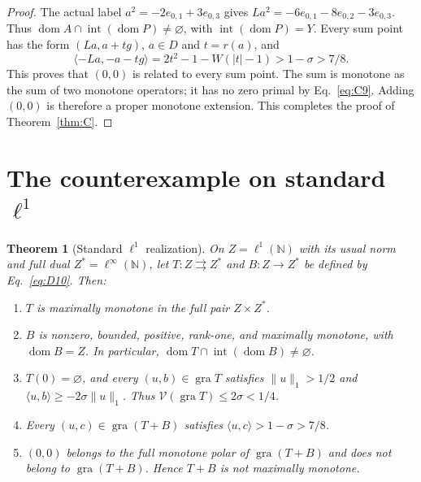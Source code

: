 \documentclass[11pt]{article}
\newcommand{\N}{\mathbb N}
\newcommand{\gra}{\operatorname{gra}}
\newcommand{\dom}{\operatorname{dom}}
\newcommand{\pair}[2]{\langle #1,#2\rangle}
\newtheorem{theorem}{Theorem}
\begin{document}
\begin{proof}
The actual label $a^2=-2e_{0,1}+3e_{0,3}$ gives
$La^2=-6e_{0,1}-8e_{0,2}-3e_{0,3}$. Thus
$\dom A\cap\operatorname{int}(\dom P)\ne\varnothing$, with
$\operatorname{int}(\dom P)=Y$. Every sum point has the form
$(La,a+tg)$, $a\in D$ and $t=r(a)$, and
\begin{equation}
\pair{-La}{-a-tg}=2t^2-1-W(|t|-1)>1-\sigma>7/8.
\tag{C11}\label{eq:C11}
\end{equation}
This proves that $(0,0)$ is related to every sum point. The sum is
monotone as the sum of two monotone operators; it has no zero primal by
Eq.~\eqref{eq:C9}. Adding $(0,0)$ is therefore a proper monotone extension.
This completes the proof of Theorem~\ref{thm:C}.
\end{proof}

\ifdefined\expandedversion
\section{The counterexample on standard $\ell^1$}
\label{sec:l1}
\renewcommand{\thetheorem}{L}
\begin{theorem}[Standard $\ell^1$ realization]\label{thm:L}
On $Z=\ell^1(\N)$ with its usual norm and full dual $Z^*=\ell^\infty(\N)$,
let $T:Z\rightrightarrows Z^*$ and $B:Z\to Z^*$ be defined by Eq.~\eqref{eq:D10}.
Then:
\begin{enumerate}
\item $T$ is maximally monotone in the full pair $Z\times Z^*$.
\item $B$ is nonzero, bounded, positive, rank-one, and maximally monotone,
with $\dom B=Z$. In particular,
$\dom T\cap\operatorname{int}(\dom B)\ne\varnothing$.
\item $T(0)=\varnothing$, and every $(u,b)\in\gra T$ satisfies
$\|u\|_1>1/2$ and $\pair{u}{b}\ge-2\sigma\|u\|_1$.
Thus $\mathcal V(\gra T)\le2\sigma<1/4$.
\item Every $(u,c)\in\gra(T+B)$ satisfies
$\pair{u}{c}>1-\sigma>7/8$.
\item $(0,0)$ belongs to the full monotone polar of $\gra(T+B)$ and does
not belong to $\gra(T+B)$. Hence $T+B$ is not maximally monotone.
\end{enumerate}
\end{theorem}
\end{document}
